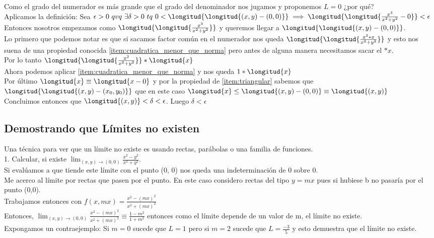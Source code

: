 \documentclass[10pt,a4paper]{article}
\begin{document}
Como el grado del numerador es más grande que el grado del denominador nos jugamos y proponemos $L=0$ ¿por qué? \\
Aplicamos la definición: Sea $\epsilon > 0 \ qvq \ \exists \delta > 0 \ tq \ 0 < \longitud{\longitud{(x, y) - (0, 0)}} \implies \longitud{\longitud{\frac{x^{3}}{x^{2} + y^{2}}-0}} < \epsilon$ \\
Entonces nosotros empezamos como $\longitud{\longitud{\frac{x^{3}}{x^{2} + y^{2}}}}$ y queremos llegar a $\longitud{\longitud{(x, y) - (0, 0)}}$. \\
Lo primero que podemos notar es que si sacamos factor común en el numerador nos queda $\longitud{\longitud{\frac{x^{2} * x}{x^{2} + y^{2}}}}$ y esto nos suena de una propiedad conocida \ref{item:cuadratica_menor_que_norma} pero antes de alguna manera necesitamos sacar el $*x$. \\
Por lo tanto $\longitud{\longitud{\frac{x^{2}}{x^{2} + y^{2}}}} * \longitud{x}$ \\
Ahora podemos aplicar \ref{item:cuadratica_menor_que_norma} y nos queda $1 * \longitud{x}$ \\
Por último $\longitud{x} \equiv \longitud{x-0}$ y por la propiedad de \ref{item:triangular} sabemos que $\longitud{\longitud{(x, y) - (x_{0}, y_{0})}}$ que en este caso $\longitud{x} \le \longitud{(x, y) - (0, 0)} \equiv \longitud{(x, y)} $ \\
Concluimos entonces que $\longitud{(x, y)} < \delta  < \epsilon $. Luego $\delta < \epsilon$
\subsection*{Demostrando que Límites no existen}
Una técnica para ver que un límite no existe es usando rectas, parábolas o una familia de funciones. \\
1. Calcular, si existe $\lim_{(x,y) \rightarrow (0, 0)} \frac{x^{2} - y^{2}}{x^{2} + y^{2}}$. \\
Si evalúamos a que tiende este límite con el punto (0, 0) nos queda una indeterminación de 0 sobre 0. \\
Me acerco al límite por rectas que pasen por el punto. En este caso considero rectas del tipo $y = mx$ pues si hubiese b no pasaría por el punto (0,0). \\
Trabajamos entonces con $f(x, mx) = \frac{x^{2} - (mx)^{2}}{x^{2} + (mx)^{2}}$ \\
Entonces, $\lim_{(x,y) \rightarrow (0, 0)} \frac{x^{2} - (mx)^{2}}{x^{2} + (mx)^{2}} \equiv \frac{1-m^{2}}{1+m^{2}}$ entonces como el límite depende de un valor de m, el límite no existe. \\
Expongamos un contraejemplo: Si $m=0$ sucede que $L=1$ pero si $m=2$ sucede que $L=\frac{-3}{5}$ y esto demuestra que el límite no existe.
\end{document}
